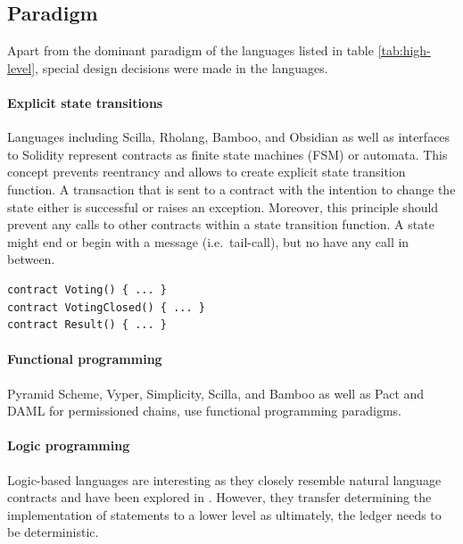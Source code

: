 \subsection{Paradigm}
Apart from the dominant paradigm of the languages listed in table \ref{tab:high-level}, special design decisions were made in the languages.

\paragraph{Explicit state transitions}
Languages including Scilla, Rholang, Bamboo, and Obsidian as well as interfaces to Solidity \cite{Mavridou2018} represent contracts as finite state machines (FSM) or automata. This concept prevents reentrancy and allows to create explicit state transition function. A transaction that is sent to a contract with the intention to change the state either is successful or raises an exception. Moreover, this principle should prevent any calls to other contracts within a state transition function. A state might end or begin with a message (i.e.\ tail-call), but no have any call in between.

\begin{lstlisting}[caption={A separation of states represented in Bamboo, where each state represents a different contract at the same address.},label=lst:fsm,language=Solidity]
contract Voting() { ... }
contract VotingClosed() { ... }
contract Result() { ... }
\end{lstlisting}

\paragraph{Functional programming}
Pyramid Scheme, Vyper, Simplicity, Scilla, and Bamboo as well as Pact and DAML for permissioned chains, use functional programming paradigms.

\paragraph{Logic programming}
Logic-based languages are interesting as they closely resemble natural language contracts and have been explored in \cite{Idelberger2016}. However, they transfer determining the implementation of statements to a lower level as ultimately, the ledger needs to be deterministic.

